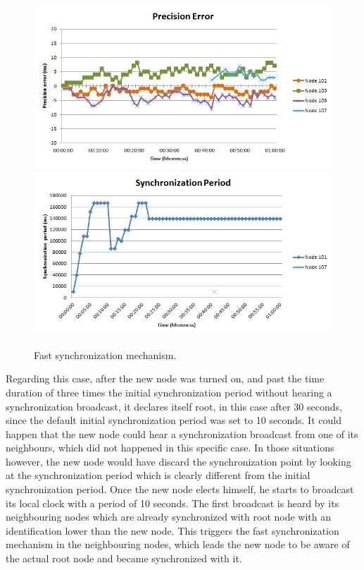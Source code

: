 \begin{figure}[!htb]
\begin{center}
\includegraphics[scale=0.4]{./images/15-ttsp-10ms6nodes-fastsync-error.png}
\includegraphics[scale=0.4]{./images/16-ttsp-10ms6nodes-fastsync-period.png}
\end{center}
\caption{Fast synchronization mechanism.}
\label{fastsync}
\end{figure}

Regarding this case, after the new node was turned on, and past the time duration of three times the initial synchronization period without hearing a synchronization broadcast, it declares itself root, in this case after 30 seconds, since the default initial synchronization period was set to 10 seconds. It could happen that the new node could hear a synchronization broadcast from one of its neighbours, which did not happened in this specific case. In those situations however, the new node would have discard the synchronization point by looking at the synchronization period which is clearly different from the initial synchronization period. Once the new node elects himself, he starts to broadcast its local clock with a period of 10 seconds. The first broadcast is heard by its neighbouring nodes which are already synchronized with root node with an identification lower than the new node. This triggers the fast synchronization mechanism in the neighbouring nodes, which leads the new node to be aware of the actual root node and became synchronized with it. 

